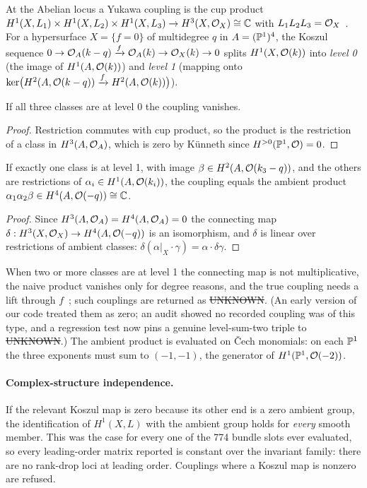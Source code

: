 At the Abelian locus a Yukawa coupling is the cup product
$H^1(X,L_1)\times H^1(X,L_2)\times H^1(X,L_3)\to H^3(X,\mathcal{O}_X)\cong\mathbb{C}$ with
$L_1L_2L_3=\mathcal{O}_X$~\cite{AGGHL2010,BBCL2016}. For a hypersurface $X=\{f=0\}$ of
multidegree $q$ in $A=(\mathbb{P}^1)^4$, the Koszul sequence
$0\to\mathcal{O}_A(k-q)\xrightarrow{f}\mathcal{O}_A(k)\to\mathcal{O}_X(k)\to0$ splits $H^1(X,\mathcal{O}(k))$ into
\emph{level 0} (the image of $H^1(A,\mathcal{O}(k))$) and \emph{level 1} (mapping onto
$\ker\bigl(H^2(A,\mathcal{O}(k-q))\xrightarrow{f}H^2(A,\mathcal{O}(k))\bigr)$).

\begin{lemma}\label{lem:level0}
If all three classes are at level 0 the coupling vanishes.
\end{lemma}
\begin{proof}
Restriction commutes with cup product, so the product is the restriction of a
class in $H^3(A,\mathcal{O}_A)$, which is zero by Künneth since $H^{>0}(\mathbb{P}^1,\mathcal{O})=0$.
\end{proof}

\begin{proposition}\label{prop:level1}
If exactly one class is at level 1, with image $\beta\in H^2(A,\mathcal{O}(k_3-q))$, and
the others are restrictions of $\alpha_i\in H^1(A,\mathcal{O}(k_i))$, the coupling equals
the ambient product $\alpha_1\alpha_2\beta\in H^4(A,\mathcal{O}(-q))\cong\mathbb{C}$.
\end{proposition}
\begin{proof}
Since $H^3(A,\mathcal{O}_A)=H^4(A,\mathcal{O}_A)=0$ the connecting map
$\delta:H^3(X,\mathcal{O}_X)\to H^4(A,\mathcal{O}(-q))$ is an isomorphism, and $\delta$ is linear
over restrictions of ambient classes:
$\delta(\alpha|_X\cdot\gamma)=\alpha\cdot\delta\gamma$.
\end{proof}

When two or more classes are at level 1 the connecting map is not
multiplicative, the naive product vanishes only for degree reasons, and the
true coupling needs a lift through $f$~\cite{BBL2017}; such couplings are
returned as \st{UNKNOWN}. (An early version of our code treated them as zero; an
audit showed no recorded coupling was of this type, and a regression test now
pins a genuine level-sum-two triple to \st{UNKNOWN}.) The ambient product is
evaluated on \v{C}ech monomials: on each $\mathbb{P}^1$ the three exponents must sum to
$(-1,-1)$, the generator of $H^1(\mathbb{P}^1,\mathcal{O}(-2))$.

\paragraph{Complex-structure independence.} If the relevant Koszul map is zero
because its other end is a zero ambient group, the identification of $H^1(X,L)$
with the ambient group holds for \emph{every} smooth member. This was the case
for every one of the 774 bundle slots ever evaluated, so every leading-order
matrix reported is constant over the invariant family: there are no rank-drop
loci at leading order. Couplings where a Koszul map is nonzero are refused.

